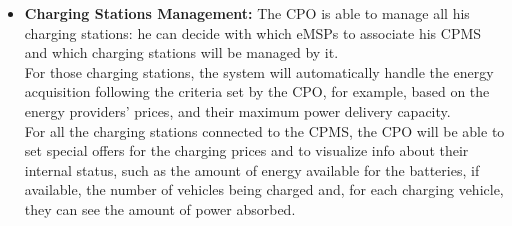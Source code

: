 \begin{itemize}
    \item \textbf{Charging Stations Management:} The CPO is able to manage all his charging stations: he can decide with which eMSPs to associate his CPMS and which charging stations will be managed by it.\\
    For those charging stations, the system will automatically handle the energy acquisition following the criteria set by the CPO, for example, based on the energy providers' prices, and their maximum power delivery capacity.\\
    For all the charging stations connected to the CPMS, the CPO will be able to set special offers for the charging prices and to visualize info about their internal status, such as the amount of energy available for the batteries, if available, the number of vehicles being charged and, for each charging vehicle, they can see the amount of power absorbed. 
\end{itemize}

